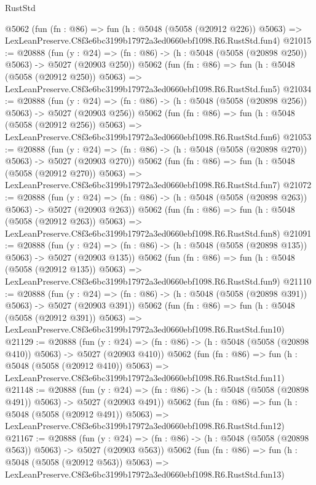 \begin{lexlean}{RustStd}
\begin{coremodule}
    @5062
    (fun (fn : @86) =>
    fun (h : @5048 (@5058 (@20912 @226)) @5063) =>
    LexLeanPreserve.C8f3e6bc3199b17972a3ed0660ebf1098.R6.RustStd.fun4)
@21015 := @20888
    (fun (y : @24) => (fn : @86) -> (h : @5048 (@5058 (@20898 @250)) @5063) -> @5027 (@20903 @250))
    @5062
    (fun (fn : @86) =>
    fun (h : @5048 (@5058 (@20912 @250)) @5063) =>
    LexLeanPreserve.C8f3e6bc3199b17972a3ed0660ebf1098.R6.RustStd.fun5)
@21034 := @20888
    (fun (y : @24) => (fn : @86) -> (h : @5048 (@5058 (@20898 @256)) @5063) -> @5027 (@20903 @256))
    @5062
    (fun (fn : @86) =>
    fun (h : @5048 (@5058 (@20912 @256)) @5063) =>
    LexLeanPreserve.C8f3e6bc3199b17972a3ed0660ebf1098.R6.RustStd.fun6)
@21053 := @20888
    (fun (y : @24) => (fn : @86) -> (h : @5048 (@5058 (@20898 @270)) @5063) -> @5027 (@20903 @270))
    @5062
    (fun (fn : @86) =>
    fun (h : @5048 (@5058 (@20912 @270)) @5063) =>
    LexLeanPreserve.C8f3e6bc3199b17972a3ed0660ebf1098.R6.RustStd.fun7)
@21072 := @20888
    (fun (y : @24) => (fn : @86) -> (h : @5048 (@5058 (@20898 @263)) @5063) -> @5027 (@20903 @263))
    @5062
    (fun (fn : @86) =>
    fun (h : @5048 (@5058 (@20912 @263)) @5063) =>
    LexLeanPreserve.C8f3e6bc3199b17972a3ed0660ebf1098.R6.RustStd.fun8)
@21091 := @20888
    (fun (y : @24) => (fn : @86) -> (h : @5048 (@5058 (@20898 @135)) @5063) -> @5027 (@20903 @135))
    @5062
    (fun (fn : @86) =>
    fun (h : @5048 (@5058 (@20912 @135)) @5063) =>
    LexLeanPreserve.C8f3e6bc3199b17972a3ed0660ebf1098.R6.RustStd.fun9)
@21110 := @20888
    (fun (y : @24) => (fn : @86) -> (h : @5048 (@5058 (@20898 @391)) @5063) -> @5027 (@20903 @391))
    @5062
    (fun (fn : @86) =>
    fun (h : @5048 (@5058 (@20912 @391)) @5063) =>
    LexLeanPreserve.C8f3e6bc3199b17972a3ed0660ebf1098.R6.RustStd.fun10)
@21129 := @20888
    (fun (y : @24) => (fn : @86) -> (h : @5048 (@5058 (@20898 @410)) @5063) -> @5027 (@20903 @410))
    @5062
    (fun (fn : @86) =>
    fun (h : @5048 (@5058 (@20912 @410)) @5063) =>
    LexLeanPreserve.C8f3e6bc3199b17972a3ed0660ebf1098.R6.RustStd.fun11)
@21148 := @20888
    (fun (y : @24) => (fn : @86) -> (h : @5048 (@5058 (@20898 @491)) @5063) -> @5027 (@20903 @491))
    @5062
    (fun (fn : @86) =>
    fun (h : @5048 (@5058 (@20912 @491)) @5063) =>
    LexLeanPreserve.C8f3e6bc3199b17972a3ed0660ebf1098.R6.RustStd.fun12)
@21167 := @20888
    (fun (y : @24) => (fn : @86) -> (h : @5048 (@5058 (@20898 @563)) @5063) -> @5027 (@20903 @563))
    @5062
    (fun (fn : @86) =>
    fun (h : @5048 (@5058 (@20912 @563)) @5063) =>
    LexLeanPreserve.C8f3e6bc3199b17972a3ed0660ebf1098.R6.RustStd.fun13)

\end{coremodule}
\end{lexlean}
